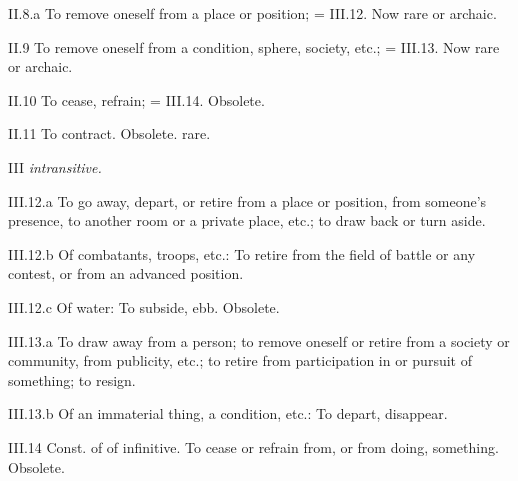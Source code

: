 \begin{compactitem}
		\item[II.8.a] To remove oneself from a place or position; = III.12. Now rare or archaic.
		\item[II.9] To remove oneself from a condition, sphere, society, etc.; = III.13. Now rare or archaic.
		\item[II.10] To cease, refrain; = III.14. Obsolete.
		\item[II.11] To contract. Obsolete. rare.
		\item[III] \textit{intransitive.}
		\item[III.12.a] To go away, depart, or retire from a place or position, from someone's presence, to another room or a private place, etc.; to draw back or turn aside.
		\item[III.12.b] Of combatants, troops, etc.: To retire from the field of battle or any contest, or from an advanced position.
		\item[III.12.c] Of water: To subside, ebb. Obsolete.
		\item[III.13.a] To draw away from a person; to remove oneself or retire from a society or community, from publicity, etc.; to retire from participation in or pursuit of something; to resign.
		\item[III.13.b] Of an immaterial thing, a condition, etc.: To depart, disappear.
		\item[III.14] Const. of of infinitive. To cease or refrain from, or from doing, something. Obsolete.
	\end{compactitem}
	

	


